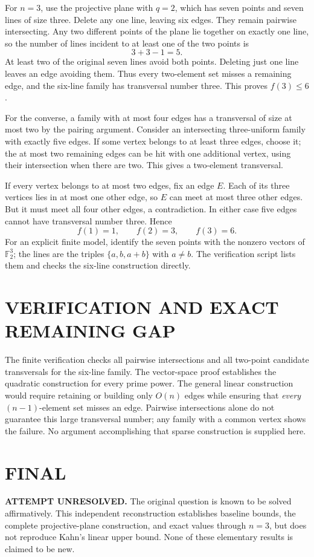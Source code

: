 For $n=3$, use the projective plane with $q=2$, which has seven points and seven lines of size three. Delete any one line, leaving six edges. They remain pairwise intersecting. Any two different points of the plane lie together on exactly one line, so the number of lines incident to at least one of the two points is
\[
 3+3-1=5.
\]
At least two of the original seven lines avoid both points. Deleting just one line leaves an edge avoiding them. Thus every two-element set misses a remaining edge, and the six-line family has transversal number three. This proves $f(3)\le6$.

For the converse, a family with at most four edges has a transversal of size at most two by the pairing argument. Consider an intersecting three-uniform family with exactly five edges. If some vertex belongs to at least three edges, choose it; the at most two remaining edges can be hit with one additional vertex, using their intersection when there are two. This gives a two-element transversal.

If every vertex belongs to at most two edges, fix an edge $E$. Each of its three vertices lies in at most one other edge, so $E$ can meet at most three other edges. But it must meet all four other edges, a contradiction. In either case five edges cannot have transversal number three. Hence
\[
 \boxed{f(1)=1,\qquad f(2)=3,\qquad f(3)=6.}
\]
For an explicit finite model, identify the seven points with the nonzero vectors of $\mathbb F_2^3$; the lines are the triples $\{a,b,a+b\}$ with $a\ne b$. The verification script lists them and checks the six-line construction directly.

\section{VERIFICATION AND EXACT REMAINING GAP}
The finite verification checks all pairwise intersections and all two-point candidate transversals for the six-line family. The vector-space proof establishes the quadratic construction for every prime power. The general linear construction would require retaining or building only $O(n)$ edges while ensuring that \emph{every} $(n-1)$-element set misses an edge. Pairwise intersections alone do not guarantee this large transversal number; any family with a common vertex shows the failure. No argument accomplishing that sparse construction is supplied here.

\section{FINAL}
\textbf{ATTEMPT UNRESOLVED.} The original question is known to be solved affirmatively. This independent reconstruction establishes baseline bounds, the complete projective-plane construction, and exact values through $n=3$, but does not reproduce Kahn's linear upper bound. None of these elementary results is claimed to be new.

